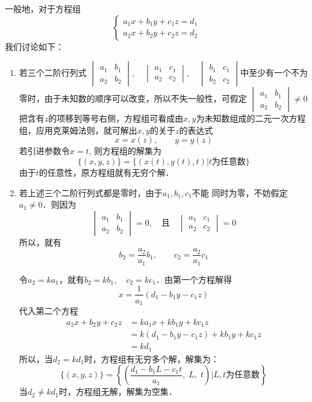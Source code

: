 一般地，对于方程组
\[\begin{cases}
    a_1x+b_1y+c_1z=d_1\\
    a_2x+b_2y+c_2z=d_2
\end{cases}\]
我们讨论如下：

\begin{enumerate}
    \item 若三个二阶行列式
$\begin{vmatrix}
    a_1&b_1\\a_2&b_2
\end{vmatrix},\quad \begin{vmatrix}
    a_1&c_1\\a_2&c_2
\end{vmatrix},\quad \begin{vmatrix}
    b_1&c_1\\b_2&c_2
\end{vmatrix}$中至少有一个不为零时，由于未知数的顺序可以改变，所以不失一般性，可假定
$\begin{vmatrix}
    a_1&b_1\\a_2&b_2
\end{vmatrix}\ne 0$
把含有$z$的项移到等号右侧，方程组可看成由$x,y$为未知数组成的二元一次方程组，应用克莱姆法则，就可解出$x,y$的关于$z$的表达式
\[x=x (z) ,\qquad y=y (z) \]
若引进参数令$x=t$, 则方程组的解集为
\[\{(x,y,z)\} =\{(x(t),y(t),t)|\text{$t$为任意数}\}\]
由于$t$的任意性，原方程组就有无穷个解．
\item  若上述三个二阶行列式都是零时，由于$a_1,b_1,c_1$不能
同时为零，不妨假定$a_1\ne 0$．则因为
\[\begin{vmatrix}
    a_1&b_1\\a_2&b_2
\end{vmatrix}=0,\quad \text{且}\quad \begin{vmatrix}
    a_1&c_1\\a_2&c_2
\end{vmatrix}=0\]
所以，就有
\[b_2=\frac{a_2}{a_1}b_1,\qquad c_2=\frac{a_2}{a_1}c_1\]

令$a_2=ka_1$，就有$b_2=kb_1,\quad c_2=kc_1$．由第一个方程解得
\[x=\frac{1}{a_1}(d_1-b_1y-c_1z)\]
代入第二个方程
\[\begin{split}
    a_2x+b_2y+c_2z&=ka_1x+kb_1y+kc_1z\\
    &=k(d_1-b_1y-c_1z)+kb_1y+kc_1z\\
    &=kd_1
\end{split}\]
所以，当$d_2=kd_1$时，方程组有无穷多个解，解集为：
\[\{(x,y,z)\}=\left\{\left(\frac{d_1-b_1L-c_1t}{a_1},\;L,\;t\right)\big|\text{$L,t$为任意数}\right\}\]
当$d_2\ne kd_1$时，方程组无解，解集为空集．
\end{enumerate}
    
